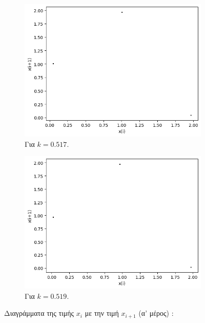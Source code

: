 \begin{figure}[h!]
\begin{subfigure}[b]{0.4\textwidth}
		\includegraphics[width=\textwidth]{LateX images/graphs/k0517}
		\caption{Για $k=0.517$.}
	\end{subfigure}
	\hfill
	\begin{subfigure}[b]{0.4\textwidth}
		\centering
		\includegraphics[width=\textwidth]{LateX images/graphs/k0519}
		\caption{Για $k=0.519$.}
		\label{f:k7}
	\end{subfigure}
	\hfill
\caption{Διαγράμματα της τιμής \(x_i\) με την τιμή \(x_{i+1}\) (α' μέρος) :}
\end{figure}


